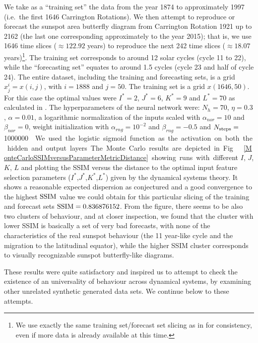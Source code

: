 \documentclass[journal]{IEEEtran}
\begin{document}
We take as a ``training set'' the data from the year 1874 to 
approximately 1997 (i.e.\ the first 1646 Carrington Rotations). We then attempt to reproduce or forecast the sunspot area butterfly 
diagram from Carrington Rotation 1921 up to 2162 (the last one corresponding approximately to the year 2015); that is, we use 1646 time 
slices ($\approx 122.92$ years) to reproduce the next 242 time slices ($\approx 18.07$ years)\footnote{We use exactly
the same training set/forecast set slicing as in \cite{covas2016,covaspeixinhojoao} for consistency, even if more data is already
available at this time.}. The training set 
corresponds to around 12 solar cycles (cycle 11 to 22), while the ``forecasting set'' equates to around 1.5 cycles 
(cycle 23 and half of cycle 24). The entire dataset, including the training and forecasting sets, is a grid $x^i_j=x(i,j)$, with 
$i=1888$ and $j=50$. The training set is a grid $x(1646,50)$. For this case the optimal values were $I^*=2$, $J^*=6$, $K^*=9$ and 
$L^*=70$ as calculated in \cite{covas2016}. 
The hyperparameters of the neural network were:
$N_h=70$, $\eta=0.3$, $\alpha=0.01$, a logarithmic normalization of the inputs scaled
 with $\alpha_{nor} = 10$ and $\beta_{nor} = 0$, weight initialization with $\alpha_{rng} = 10^{-2}$ and $\beta_{rng} = -0.5$ 
 and $N_{\textnormal{steps}}=$\SI{1000000}\nobreak. We used the logistic sigmoid function as the activation on both the hidden and output layers.

The Monte Carlo results are depicted in Fig.\ \ref{MonteCarloSSIMversusParameterMetricDistance} showing runs with different $I$, $J$, $K$, $L$
and plotting the SSIM versus the distance  to the optimal input feature selection parameters ($I^*$,$J^*$,$K^*$,$L^*$) 
given by the dynamical systems theory.  
It shows a reasonable expected dispersion as conjectured and 
a good convergence to the highest $\textnormal{SSIM}$ value we could obtain for this particular slicing of the training and forecast sets 
$\textnormal{SSIM}= 0.836876152$. From the figure, there seems to be also two clusters of behaviour, and at closer inspection, we found that the
cluster with lower SSIM is basically a set of very bad forecasts, with none of the characteristics of the real sunspot behaviour (the 11 year-like cycle
and the migration to the latitudinal equator), while the higher SSIM cluster corresponds to visually recognizable sunspot butterfly-like diagrams.



These results were quite satisfactory and inspired us to attempt to check the existence of  an universality of behaviour across
dynamical systems, by examining other unrelated synthetic
generated data sets. We continue below to these attempts.
\end{document}
